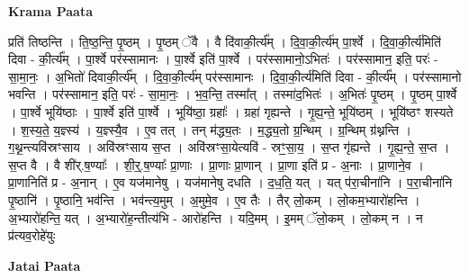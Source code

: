 \documentclass[17pt]{extarticle}
\begin{document}
\textbf{Krama Paata} \newline

प्रति॑ तिष्ठन्ति । ति॒ष्ठ॒न्ति॒ पृ॒ष्ठम् । पृ॒ष्ठम् ॅवै । वै दि॑वाकी॒र्त्य᳚म् । दि॒वा॒की॒र्त्य॑म् पा॒र्श्वे । दि॒वा॒की॒र्त्य॑मिति॑ दिवा - की॒र्त्य᳚म् । पा॒र्श्वे पर॑स्सामानः । पा॒र्श्वे इति॑ पा॒र्श्वे । पर॑स्सामानो॒ऽभितः॑ । पर॑स्सामान॒ इति॒ परः॑ - सा॒मा॒नः॒ । अ॒भितो॑ दिवाकी॒र्त्य᳚म् । दि॒वा॒की॒र्त्य॑म् पर॑स्सामानः । दि॒वा॒की॒र्त्य॑मिति॑ दिवा - की॒र्त्य᳚म् । पर॑स्सामानो भवन्ति । पर॑स्सामान॒ इति॒ परः॑ - सा॒मा॒नः॒ । भ॒व॒न्ति॒ तस्मा᳚त् । तस्मा॑द॒भितः॑ । अ॒भितः॑ पृ॒ष्ठम् । पृ॒ष्ठम् पा॒र्श्वे । पा॒र्श्वे भूयि॑ष्ठाः । पा॒र्श्वे इति॑ पा॒र्श्वे । भूयि॑ष्ठा॒ ग्रहाः᳚ । ग्रहा॑ गृह्यन्ते । गृ॒ह्य॒न्ते॒ भूयि॑ष्ठम् । भूयि॑ष्ठꣳ शस्यते । श॒स्य॒ते॒ य॒ज्ञ्स्य॑ । य॒ज्ञ्स्यै॒व । ए॒व तत् । तन् म॑द्ध्य॒तः । म॒द्ध्य॒तो ग्र॒न्थिम् । ग्र॒न्थिम् ग्र॑थ्नन्ति । ग॒थ्न॒न्त्यवि॑स्रꣳसाय । अवि॑स्रꣳसाय स॒प्त । अवि॑स्रꣳसा॒येत्यवि॑ - स्रꣳ॒॒सा॒य॒ । स॒प्त गृ॑ह्यन्ते । गृ॒ह्य॒न्ते॒ स॒प्त । स॒प्त वै । वै शी॑र्.ष॒ण्याः᳚ । शी॒र्॒.ष॒ण्याः᳚ प्रा॒णाः । प्रा॒णाः प्रा॒णान् । प्रा॒णा इति॑ प्र - अ॒नाः । प्रा॒णाने॒व । प्रा॒णानिति॑ प्र - अ॒नान् । ए॒व यज॑मानेषु । यज॑मानेषु दधति । द॒ध॒ति॒ यत् । यत् प॑रा॒चीना॑नि । प॒रा॒चीना॑नि पृ॒ष्ठानि॑ । पृ॒ष्ठानि॒ भव॑न्ति । भव॑न्त्य॒मुम् । अ॒मुमे॒व । ए॒व तैः । तैर् लो॒कम् । लो॒कम॒भ्यारो॑हन्ति । अ॒भ्यारो॑हन्ति॒ यत् । अ॒भ्यारो॑ह॒न्तीत्य॑भि - आरो॑हन्ति । यदि॒मम् । इ॒मम् ॅलो॒कम् । लो॒कम् न । न प्र॑त्यव॒रोहे॑युः \newline

\textbf{Jatai Paata} \newline
\end{document}

